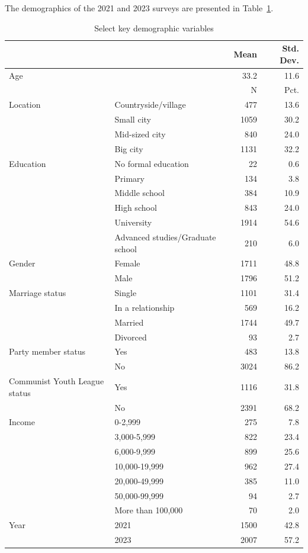 \documentclass[
  letterpaper,
  DIV=11,
  numbers=noendperiod]{scrartcl}
\begin{document}
The demographics of the 2021 and 2023 surveys are presented in
Table~\ref{tbl-demographics}.

\begin{longtable}[t]{llrr}

\caption{\label{tbl-demographics}Select key demographic variables}

\tabularnewline

\toprule
  &    & Mean & Std. Dev.\\
\midrule
Age &  & 33.2 & 11.6\\
\midrule
 &  & N & Pct.\\
Location & Countryside/village & 477 & 13.6\\
 & Small city & 1059 & 30.2\\
 & Mid-sized city & 840 & 24.0\\
 & Big city & 1131 & 32.2\\
Education & No formal education & 22 & 0.6\\
 & Primary & 134 & 3.8\\
 & Middle school & 384 & 10.9\\
 & High school & 843 & 24.0\\
 & University & 1914 & 54.6\\
 & Advanced studies/Graduate school & 210 & 6.0\\
Gender & Female & 1711 & 48.8\\
 & Male & 1796 & 51.2\\
Marriage status & Single & 1101 & 31.4\\
 & In a relationship & 569 & 16.2\\
 & Married & 1744 & 49.7\\
 & Divorced & 93 & 2.7\\
Party member status & Yes & 483 & 13.8\\
 & No & 3024 & 86.2\\
Communist Youth League status & Yes & 1116 & 31.8\\
 & No & 2391 & 68.2\\
Income & 0-2,999 & 275 & 7.8\\
 & 3,000-5,999 & 822 & 23.4\\
 & 6,000-9,999 & 899 & 25.6\\
 & 10,000-19,999 & 962 & 27.4\\
 & 20,000-49,999 & 385 & 11.0\\
 & 50,000-99,999 & 94 & 2.7\\
 & More than 100,000 & 70 & 2.0\\
Year & 2021 & 1500 & 42.8\\
 & 2023 & 2007 & 57.2\\
\bottomrule

\end{longtable}
\end{document}
